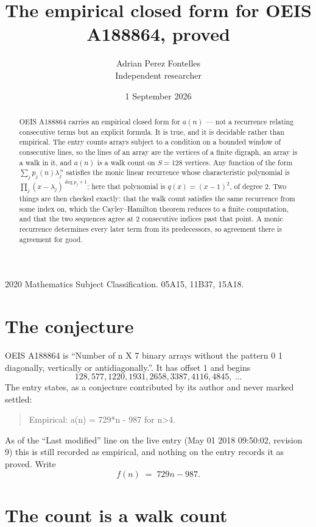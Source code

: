 \documentclass[11pt,a4paper]{article}
\title{The empirical closed form for OEIS A188864, proved}
\author{Adrian Perez Fontelles\\ \small Independent researcher}
\date{1 September 2026}
\theoremstyle{plain}
\theoremstyle{definition}
\begin{document}
\maketitle

\begin{abstract}
OEIS A188864 carries an empirical closed form for $a(n)$ --- not a recurrence relating
consecutive terms but an explicit formula. It is true, and it is decidable rather than
empirical. The entry counts arrays subject to a condition on a bounded window of consecutive lines, so the lines of an array are the
vertices of a finite digraph, an array is a walk in it, and $a(n)$ is a walk count on
$S=128$ vertices. Any function of the form $\sum_j p_j(n)\lambda_j^{\,n}$ satisfies the
monic linear recurrence whose characteristic polynomial is
$\prod_j(x-\lambda_j)^{\deg p_j+1}$; here that polynomial is $q(x)=(x-1)^{2}$, of degree
$2$. Two things are then checked exactly: that the walk count satisfies the same
recurrence from some index on, which the Cayley--Hamilton theorem reduces to a finite
computation, and that the two sequences agree at $2$ consecutive indices past that
point. A monic recurrence determines every later term from its predecessors, so agreement
there is agreement for good.
\end{abstract}

\noindent\small 2020 Mathematics Subject Classification. 05A15, 11B37, 15A18.\normalsize

\section{The conjecture}

OEIS A188864 is ``Number of n X 7 binary arrays without the pattern 0 1 diagonally, vertically or antidiagonally.''. It has offset $1$ and begins
\[
128, 577, 1220, 1931, 2658, 3387, 4116, 4845,\ \dots
\]
The entry states, as a conjecture contributed by its author and never marked settled:
\begin{quote}
Empirical: a(n) = 729*n - 987 for n>4.
\end{quote}
As of the ``Last modified'' line on the live entry (May 01 2018 09:50:02, revision 9) this is still
recorded as empirical, and nothing on the entry records it as proved. Write
\[
f(n)\;=\;729 n - 987.
\]

\section{The count is a walk count}
\end{document}
